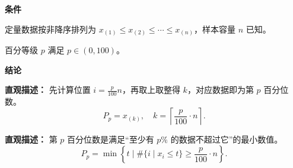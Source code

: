 \begin{statementbox}

	\textbf{\textcolor{CStatement}{条件}}
	\begin{description}[style=nextline, leftmargin=2.8em, labelsep=0.5em, itemsep=0.35em]
		\item[\textbf{\textcolor{CStatement}{条件一（数据排序）：}}] 定量数据按非降序排列为 $x_{(1)}\le x_{(2)}\le\cdots\le x_{(n)}$，样本容量 $n$ 已知。
		\item[\textbf{\textcolor{CStatement}{条件二（百分等级）：}}] 百分等级 $p$ 满足 $p\in(0,100)$。
	\end{description}

	\textbf{\textcolor{CStatement}{结论}}
	\begin{description}[style=nextline, leftmargin=2.8em, labelsep=0.5em, itemsep=0.45em]
		\item[\textbf{\textcolor{CStatement}{结论一（向上取整法）：}}]
			\textbf{\textcolor{CStatement}{直观描述：}}
			先计算位置 $i=\frac{p}{100}n$，再取上取整得 $k$，对应数据即为第 $p$ 百分位数。
			\[
				P_p = x_{(k)},\quad k = \left\lceil\frac{p}{100}\cdot n\right\rceil.
			\]
		\item[\textbf{\textcolor{CStatement}{推广结论（等价定义）：}}]
			\textbf{\textcolor{CStatement}{直观描述：}}
			第 $p$ 百分位数是满足“至少有 $p\text{\%}$ 的数据不超过它”的最小数值。
			\[
				P_p = \min\left\{t \mid \#\{i\mid x_i\le t\} \ge \frac{p}{100}\cdot n\right\}.
			\]
	\end{description}

\end{statementbox}
